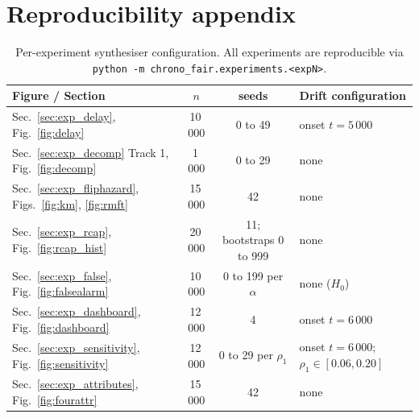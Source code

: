 \documentclass[acmsmall,nonacm,review,anonymous]{acmart}
\newcommand{\1}[1]{\mathbf{1}\!\left\{#1\right\}}
\begin{document}



\appendix

\section{Reproducibility appendix}\label{app:repro}

\begin{table}[h]
\centering
\small
\begin{tabular}{l c c l}
\toprule
Figure / Section & $n$ & seeds & Drift configuration \\
\midrule
Sec.~\ref{sec:exp_delay}, Fig.~\ref{fig:delay} & 10\,000 & 0 to 49 & onset $t = 5\,000$ \\
Sec.~\ref{sec:exp_decomp} Track 1, Fig.~\ref{fig:decomp} & 1\,000 & 0 to 29 & none \\
Sec.~\ref{sec:exp_fliphazard}, Figs.~\ref{fig:km}, \ref{fig:rmft} & 15\,000 & 42 & none \\
Sec.~\ref{sec:exp_rcap}, Fig.~\ref{fig:rcap_hist} & 20\,000 & 11; bootstraps 0 to 999 & none \\
Sec.~\ref{sec:exp_false}, Fig.~\ref{fig:falsealarm} & 10\,000 & 0 to 199 per $\alpha$ & none ($H_0$) \\
Sec.~\ref{sec:exp_dashboard}, Fig.~\ref{fig:dashboard} & 12\,000 & 4 & onset $t = 6\,000$ \\
Sec.~\ref{sec:exp_sensitivity}, Fig.~\ref{fig:sensitivity} & 12\,000 & 0 to 29 per $\rho_1$ & onset $t = 6\,000$; $\rho_1 \in [0.06, 0.20]$ \\
Sec.~\ref{sec:exp_attributes}, Fig.~\ref{fig:fourattr} & 15\,000 & 42 & none \\
\bottomrule
\end{tabular}
\caption{Per-experiment synthesiser configuration. All experiments are reproducible via \texttt{python -m chrono\_fair.experiments.<expN>}.}
\end{table}



















\end{document}

